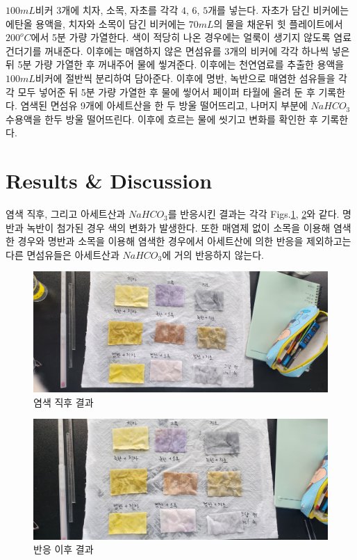 \documentclass[%
 reprint,
 amsmath,amssymb,
 aps,
]{revtex4-2}
\begin{document}
$100mL$비커 3개에 치자, 소목, 자초를 각각 $4$, $6$, $5$개를 넣는다. 자초가 담긴 비커에는 에탄올 용액을, 치자와 소목이 담긴 비커에는 $70mL$의 물을 채운뒤 힛 플레이트에서 $200^{o}C$에서 5분 가량 가열한다. 색이 적당히 나온 경우에는 얼룩이 생기지 않도록 염료 건더기를 꺼내준다. 이후에는 매염하지 않은 면섬유를 3개의 비커에 각각 하나씩 넣은뒤 5분 가량 가열한 후 꺼내주어 물에 앃겨준다. 이후에는 천연염료를 추출한 용액을 $100mL$비커에 절반씩 분리하여 담아준다. 이후에 명반, 녹반으로 매염한 섬유들을 각각 모두 넣어준 뒤 5분 가량 가열한 후 물에 앃어서 페이퍼 타월에 올려 둔 후 기록한다. 염색된 면섬유 9개에 아세트산을 한 두 방울 떨어뜨리고, 나머지 부분에 $NaHCO_{3}$ 수용액을 한두 방울 떨어뜨린다. 이후에 흐르는 물에 씻기고 변화를 확인한 후 기록한다.

\section{\label{sec:level1}Results \& Discussion}
염색 직후, 그리고 아세트산과 $NaHCO_{3}$를 반응시킨 결과는 각각 Figs.\ref{fig:Before}, \ref{fig:After}와 같다. 명반과 녹반이 첨가된 경우 색의 변화가 발생한다. 또한 매염제 없이 소목을 이용해 염색한 경우와 명반과 소목을 이용해 염색한 경우에서 아세트산에 의한 반응을 제외하고는 다른 면섬유들은 아세트산과 $NaHCO_{3}$에 거의 반응하지 않는다.
\begin{figure}[htbp]
	\includegraphics[width = 0.95\linewidth]{Before.png}%
	\caption{\label{fig:Before}염색 직후 결과}
\end{figure}
\begin{figure}[htbp]
	\includegraphics[width = 0.95\linewidth]{After.png}%
	\caption{\label{fig:After}반응 이후 결과}
\end{figure}
\end{document}
